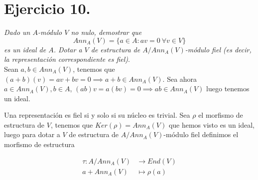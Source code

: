 \section{Ejercicio 10.} \emph{Dado un \(A\)-módulo \(V\) no nulo, demostrar que}
\[
  Ann_A(V) = \{a \in A : av = 0 \ \forall v \in V\}
\]
\emph{es un ideal de \(A\). Dotar a \(V\) de estructura de \(A/Ann_A(V)\)-módulo
  fiel (es decir, la representación correspondiente es fiel)}.\\

Sean \(a,b \in Ann_A(V)\), tenemos que \((a+b)(v) = av + bv = 0 \implies a+b \in
Ann_A(V)\).
Sea ahora \(a \in Ann_A(V), b \in A\), \((ab)v = a(bv) = 0 \implies ab \in
Ann_A(V)\) luego tenemos un ideal.

Una representación es fiel si y solo si su núcleo es trivial. Sea \(\rho\) el
morfismo de estructura de \(V\), tenemos que \(Ker(\rho) = Ann_A(V)\) que hemos
visto es un ideal, luego para dotar a \(V\) de estructura de  \(A/Ann_A(V)\)-módulo
fiel definimos el morfismo de estructura

\[
  \begin{aligned}
    \tau:A/Ann_A(V) &\to End(V) \\
    a + Ann_A(V) &\mapsto \rho(a)
  \end{aligned}
\]
